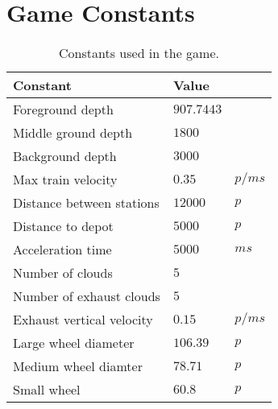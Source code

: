 \chapter{Game Constants}

\begin{table}[H]
\centering
\begin{tabular}{| l | l l |}
\hline
\textbf{Constant} & \textbf{Value} & \\
\hline
Foreground depth & $907.7443$ &\\
Middle ground depth & $1800$ &\\
Background depth & $3000$ &\\
Max train velocity & $0.35$ & $p/ms$\\
Distance between stations & $12000$ & $p$\\
Distance to depot & $5000$ & $p$\\
Acceleration time & $5000$ & $ms$\\
Number of clouds & $5$ &\\
Number of exhaust clouds & $5$ &\\
Exhaust vertical velocity & $0.15$ & $p/ms$\\
Large wheel diameter & $106.39$ & $p$\\
Medium wheel diamter & $78.71$ & $p$\\
Small wheel & $60.8$ & $p$\\
\hline
\end{tabular}
\label{tab:constants}
\caption{Constants used in the game.}
\end{table}

